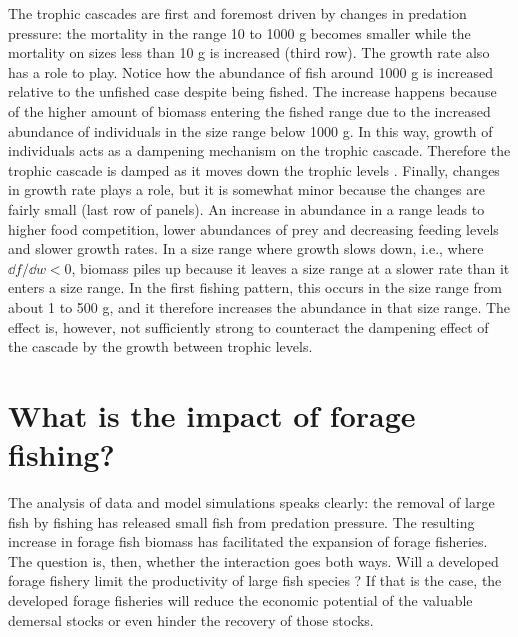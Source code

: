 The trophic cascades are first and foremost driven by changes in predation pressure: the mortality in the range 10 to 1000 g becomes smaller while the mortality on sizes less than 10 g is increased (third row).  The growth rate also has a role to play.  Notice how the abundance of fish around 1000 g is increased relative to the unfished case despite being fished.  The increase happens because of the higher amount of biomass entering the fished range due to the increased abundance of individuals in the size range below 1000 g.  In this way, growth of individuals acts as a dampening mechanism on the trophic cascade.  Therefore the trophic cascade is damped as it moves down the trophic levels \citep{Andersen2010}.  Finally, changes in growth rate plays a role, but it is somewhat minor because the changes are fairly small (last row of panels).  An increase in abundance in a range leads to higher food competition, lower abundances of prey and decreasing feeding levels and slower growth rates.  In a size range where growth slows down, i.e., where $\dd f/\dd w < 0$, biomass piles up because it leaves a size range at a slower rate than it enters a size range.  In the first fishing pattern, this occurs in the size range from about 1 to 500 g, and it therefore increases the abundance in that size range.  The effect is, however, not sufficiently strong to counteract the dampening effect of the cascade by the growth between trophic levels. 





\section{What is the impact of forage fishing?}%
The analysis of data and model simulations speaks clearly: the removal of large fish by fishing has released small fish from predation pressure.  The resulting increase in forage fish biomass has facilitated the expansion of forage fisheries.  The question is, then, whether the interaction goes both ways.  Will a developed forage fishery limit the productivity of large fish species \citep{Houle2013, Ravn-Jonsen2016}?  If that is the case, the developed forage fisheries will reduce the economic potential of the valuable demersal stocks or even hinder the recovery of those stocks.

